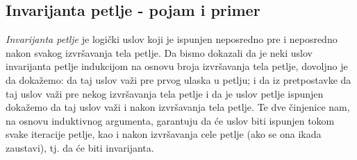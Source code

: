 \documentclass{article}
\begin{document}
\subsection{Invarijanta petlje - pojam i primer}
\textit{Invarijanta petlje} je logički uslov koji je ispunjen neposredno pre i neposredno nakon svakog izvršavanja tela petlje. Da bismo dokazali da je neki uslov invarijanta petlje indukcijom na osnovu broja izvršavanja tela petlje, dovoljno je da dokažemo: da taj uslov važi pre prvog ulaska u petlju; i 
da iz pretpostavke da taj uslov važi pre nekog izvršavanja tela petlje i da je uslov petlje ispunjen dokažemo da taj uslov važi i nakon izvršavanja tela petlje. Te dve činjenice nam, na osnovu induktivnog argumenta, garantuju da će uslov biti ispunjen tokom svake iteracije petlje, kao i nakon izvršavanja cele petlje (ako se ona ikada zaustavi), tj. da će biti invarijanta.
\end{document}
